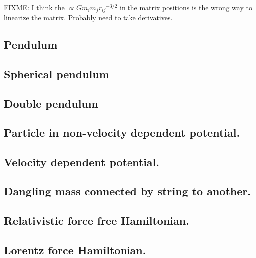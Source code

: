 FIXME: I think the $\propto G m_i m_j {r_{ij}}^{-3/2}$ in the matrix positions is the wrong way to linearize the matrix.  Probably need to take derivatives.

\subsection{Pendulum}

\subsection{Spherical pendulum}

\subsection{Double pendulum}

\subsection{Particle in non-velocity dependent potential.}

\subsection{Velocity dependent potential.}

\subsection{Dangling mass connected by string to another.}

\subsection{Relativistic force free Hamiltonian.}

\subsection{Lorentz force Hamiltonian.}

\EndArticle
